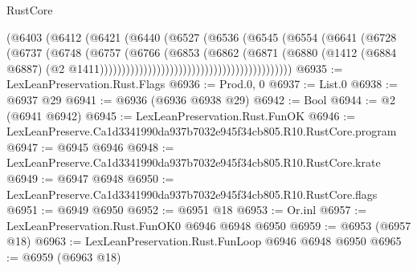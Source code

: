 \begin{lexlean}{RustCore}
\begin{coremodule}
                                                    (@6403
                                                      (@6412
                                                        (@6421
                                                          (@6440
                                                            (@6527
                                                              (@6536
                                                                (@6545
                                                                  (@6554
                                                                    (@6641
                                                                      (@6728
                                                                        (@6737
                                                                          (@6748
                                                                            (@6757
                                                                              (@6766
                                                                                (@6853
                                                                                  (@6862
                                                                                    (@6871
                                                                                      (@6880
                                                                                        (@1412
                                                                                          (@6884
                                                                                            @6887)
                                                                                          (@2
                                                                                            @1411))))))))))))))))))))))))))))))))))))))))))))
@6935 := LexLeanPreservation.Rust.Flags
@6936 := Prod.{0, 0}
@6937 := List.{0}
@6938 := @6937 @29
@6941 := @6936 (@6936 @6938 @29)
@6942 := Bool
@6944 := @2 (@6941 @6942)
@6945 := LexLeanPreservation.Rust.FunOK
@6946 := LexLeanPreserve.Ca1d3341990da937b7032e945f34cb805.R10.RustCore.program
@6947 := @6945 @6946
@6948 := LexLeanPreserve.Ca1d3341990da937b7032e945f34cb805.R10.RustCore.krate
@6949 := @6947 @6948
@6950 := LexLeanPreserve.Ca1d3341990da937b7032e945f34cb805.R10.RustCore.flags
@6951 := @6949 @6950
@6952 := @6951 @18
@6953 := Or.inl
@6957 := LexLeanPreservation.Rust.FunOK0 @6946 @6948 @6950
@6959 := @6953 (@6957 @18)
@6963 := LexLeanPreservation.Rust.FunLoop @6946 @6948 @6950
@6965 := @6959 (@6963 @18)

\end{coremodule}
\end{lexlean}
